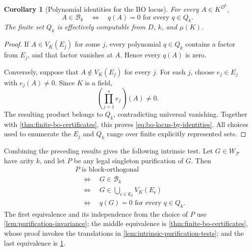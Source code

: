 \documentclass[11pt]{article}
\theoremstyle{plain}
\newtheorem{corollary}[corollary]{Corollary}
\theoremstyle{definition}
\theoremstyle{remark}
\newcommand{\cF}{\mathcal F}
\begin{document}
\begin{corollary}[Polynomial identities for the BO locus]
\label{cor:bo-product-identities}
For every $A\in K^{D^k}$,
\begin{equation}
  A\in\mathcal B_k
  \quad\Longleftrightarrow\quad
  q(A)=0\text{ for every }q\in Q_k.
  \label{eq:bo-locus-by-identities}
\end{equation}
The finite set $Q_k$ is effectively computable from $D$, $k$, and $\mu(K)$.
\end{corollary}

\begin{proof}
If $A\in V_K(E_j)$ for some $j$, every polynomial $q\in Q_k$ contains a
factor from $E_j$, and that factor vanishes at $A$.  Hence every $q(A)$ is
zero.

Conversely, suppose that $A\notin V_K(E_j)$ for every $j$.  For each $j$,
choose $e_j\in E_j$ with $e_j(A)\ne0$.  Since $K$ is a field,
\[
  \left(\prod_{j=1}^s e_j\right)(A)\ne0.
\]
The resulting product belongs to $Q_k$, contradicting universal vanishing.
Together with \cref{thm:finite-bo-certificates}, this proves
\eqref{eq:bo-locus-by-identities}.  All choices used to enumerate the
$E_j$ and $Q_k$ range over finite explicitly represented sets.
\end{proof}

Combining the preceding results gives the following intrinsic test.
Let $G\in W_{\cF}$ have arity $k$, and let $P$ be any legal singleton
purification of $G$.  Then
\begin{equation*}
\begin{aligned}
  &P\text{ is block-orthogonal}\\
  &\quad\Longleftrightarrow\quad G\in\mathcal B_k\\
  &\quad\Longleftrightarrow\quad
    G\in\bigcup_{\mathfrak c\in\mathfrak C_k}V_K(E_{\mathfrak c})\\
  &\quad\Longleftrightarrow\quad
    q(G)=0\text{ for every }q\in Q_k.
\end{aligned}
\end{equation*}
The first equivalence and its independence from the choice of $P$ use
\cref{lem:purification-invariance}; the middle equivalence is
\cref{thm:finite-bo-certificates}, whose proof invokes the translations in
\cref{lem:intrinsic-purification-tests}; and the last equivalence is
\cref{cor:bo-product-identities}.
\end{document}
